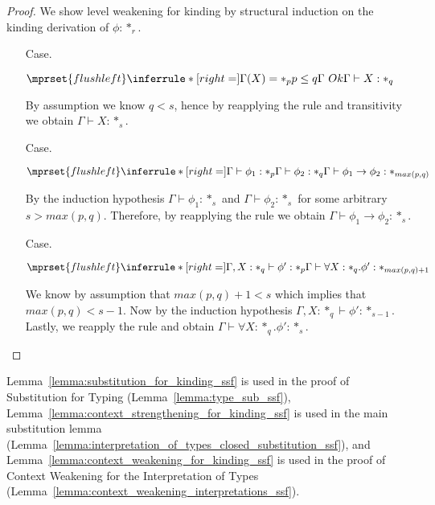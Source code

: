 \begin{proof}
  We show level weakening for kinding by structural induction on the kinding derivation 
  of $\phi:*_r$.
  \begin{itemize}
  \item[Case.]\ \\
    \begin{center}
      \begin{math}
        $$\mprset{flushleft}
        \inferrule* [right=] {
          \Gamma(X) = *_p
          \\
          p \leq q
          \\
          \Gamma\ Ok
        }{\Gamma \vdash X : *_q}
      \end{math}
    \end{center}
    By assumption we know $q < s$, hence by reapplying the rule and transitivity we 
    obtain $\Gamma \vdash X:*_s$.
    
  \item[Case.]\ \\
    \begin{center}
      \begin{math}
        $$\mprset{flushleft}
        \inferrule* [right=] {
          \Gamma \vdash \phi_1 : *_p
          \\
          \Gamma \vdash \phi_2 : *_q
        }{\Gamma \vdash \phi_1 \rightarrow \phi_2 : *_{max(p,q)}}
      \end{math}
    \end{center}
    By the induction hypothesis $\Gamma \vdash \phi_1 : *_s$ and 
    $\Gamma \vdash \phi_2 : *_s$ for some arbitrary $s > max(p,q)$.  Therefore, by 
    reapplying the rule we obtain $\Gamma \vdash \phi_1 \rightarrow \phi_2 : *_s$.
    
  \item[Case.]\ \\
    \begin{center}
      \begin{math}
        $$\mprset{flushleft}
        \inferrule* [right=] {
          \Gamma,X : *_q \vdash \phi' : *_p
        }{\Gamma \vdash \forall X:*_q.\phi' : *_{max(p,q)+1}}
      \end{math}
    \end{center}
    We know by assumption that $max(p,q) + 1 < s$ which implies that $max(p,q) < s - 1$.  
    Now by the induction hypothesis $\Gamma,X:*_q \vdash \phi':*_{s-1}$.  Lastly, we 
    reapply the rule and obtain $\Gamma \vdash \forall X:*_q.\phi' : *_{s}$.
  \end{itemize}
\end{proof}
\noindent Lemma~\ref{lemma:substitution_for_kinding_ssf} is used in
the proof of Substitution for Typing
(Lemma~\ref{lemma:type_sub_ssf}),
Lemma~\ref{lemma:context_strengthening_for_kinding_ssf} is used in the
main substitution lemma
(Lemma~\ref{lemma:interpretation_of_types_closed_substitution_ssf}),
and Lemma~\ref{lemma:context_weakening_for_kinding_ssf} is used in the
proof of Context Weakening for the Interpretation of Types
(Lemma~\ref{lemma:context_weakening_interpretations_ssf}).

